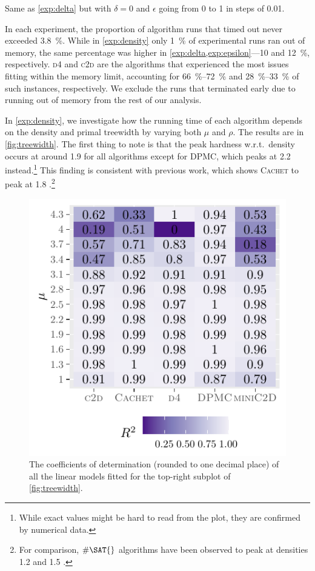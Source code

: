 \begin{experiment}[$\epsilon$]\label{exp:epsilon}
  Same as \cref{exp:delta} but with $\delta = 0$ and $\epsilon$ going from 0 to
  1 in steps of 0.01.
\end{experiment}

In each experiment, the proportion of algorithm runs that timed out never
exceeded \SI{3.8}{\percent}. While in \cref{exp:density} only \SI{1}{\percent}
of experimental runs ran out of memory, the same percentage was higher in
\cref{exp:delta,exp:epsilon}---10 and \SI{12}{\percent}, respectively.
\textsc{d4} \citep{DBLP:conf/ijcai/LagniezM17} and
\textsc{c2d} are the algorithms that
experienced the most issues fitting within the memory limit, accounting for
\SIrange{66}{72}{\percent} and \SIrange{28}{33}{\percent} of such instances,
respectively. We exclude the runs that terminated early due to running out of
memory from the rest of our analysis.

In \cref{exp:density}, we investigate how the running time of each algorithm
depends on the density and primal treewidth by varying both $\mu$ and $\rho$.
The results are in \cref{fig:treewidth}. The first thing to note is that the
peak hardness w.r.t.\ density occurs at around 1.9 for all algorithms except for
\textsc{DPMC}, which peaks at 2.2 instead.\footnote{While exact values might be hard to read from the plot, they are confirmed by numerical data.} This finding is consistent with previous work, which shows \textsc{Cachet} to peak at 1.8 \citep{DBLP:conf/sat/SangBBKP04}.\footnote{For comparison, $\#\SAT{}$ algorithms have been observed to peak at densities 1.2 and 1.5 \citep{DBLP:conf/aaai/Pehoushek00}.}

\begin{figure}[t]
  \centering
  \includegraphics{chapters/comparison/r2}
  \caption{The coefficients of determination (rounded to one decimal place) of
    all the linear models fitted for the top-right subplot of
    \cref{fig:treewidth}.}\label{fig:r2}
\end{figure}

